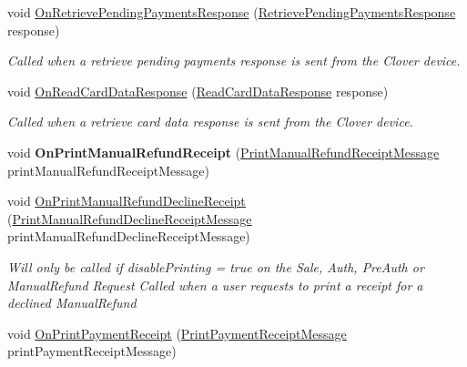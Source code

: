 \begin{DoxyCompactItemize}
void \hyperlink{interfacecom_1_1clover_1_1remotepay_1_1sdk_1_1_i_clover_connector_listener_a3567d50af6c179c41d0a47eaf4e5127b}{On\+Retrieve\+Pending\+Payments\+Response} (\hyperlink{classcom_1_1clover_1_1remotepay_1_1sdk_1_1_retrieve_pending_payments_response}{Retrieve\+Pending\+Payments\+Response} response)
\begin{DoxyCompactList}\small\item\em Called when a retrieve pending payments response is sent from the Clover device. \end{DoxyCompactList}\item 
void \hyperlink{interfacecom_1_1clover_1_1remotepay_1_1sdk_1_1_i_clover_connector_listener_af4bbb0ceeab318ef482f0e90506d36b0}{On\+Read\+Card\+Data\+Response} (\hyperlink{classcom_1_1clover_1_1remotepay_1_1sdk_1_1_read_card_data_response}{Read\+Card\+Data\+Response} response)
\begin{DoxyCompactList}\small\item\em Called when a retrieve card data response is sent from the Clover device. \end{DoxyCompactList}\item 
\mbox{\label{interfacecom_1_1clover_1_1remotepay_1_1sdk_1_1_i_clover_connector_listener_aad5540cbd5e7a4a80ae2cc562013cc98}} 
void {\bfseries On\+Print\+Manual\+Refund\+Receipt} (\hyperlink{classcom_1_1clover_1_1remotepay_1_1sdk_1_1_print_manual_refund_receipt_message}{Print\+Manual\+Refund\+Receipt\+Message} print\+Manual\+Refund\+Receipt\+Message)
\item 
void \hyperlink{interfacecom_1_1clover_1_1remotepay_1_1sdk_1_1_i_clover_connector_listener_afb0b243842251d0fa8917d21b7b71246}{On\+Print\+Manual\+Refund\+Decline\+Receipt} (\hyperlink{classcom_1_1clover_1_1remotepay_1_1sdk_1_1_print_manual_refund_decline_receipt_message}{Print\+Manual\+Refund\+Decline\+Receipt\+Message} print\+Manual\+Refund\+Decline\+Receipt\+Message)
\begin{DoxyCompactList}\small\item\em Will only be called if disable\+Printing = true on the Sale, Auth, Pre\+Auth or Manual\+Refund Request Called when a user requests to print a receipt for a declined Manual\+Refund \end{DoxyCompactList}\item 
void \hyperlink{interfacecom_1_1clover_1_1remotepay_1_1sdk_1_1_i_clover_connector_listener_ab37a0d5e7114499b3f1c55e38f6c46c9}{On\+Print\+Payment\+Receipt} (\hyperlink{classcom_1_1clover_1_1remotepay_1_1sdk_1_1_print_payment_receipt_message}{Print\+Payment\+Receipt\+Message} print\+Payment\+Receipt\+Message)

\end{DoxyCompactItemize}
